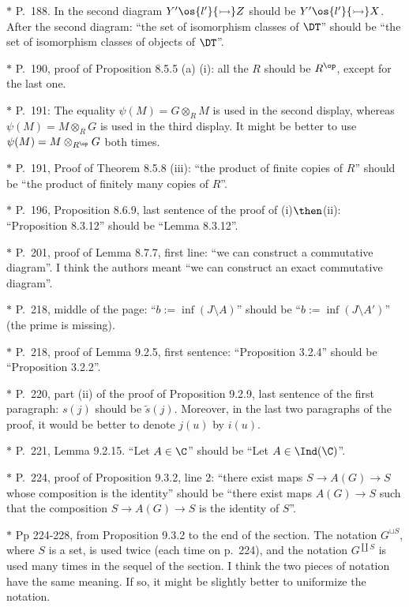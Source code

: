 \documentclass[12pt]{article}
\theoremstyle{remark}
\theoremstyle{definition}
\begin{document}
\nn$*$ P.~188. In the second diagram $Y'\os{l'}{\rightarrowtail}Z$ should be $Y'\os{l'}{\rightarrowtail}X$. After the second diagram: ``the set of isomorphism classes of $\DT$'' should be ``the set of isomorphism classes of objects of $\DT$''.

\nn$*$ P.~190, proof of Proposition 8.5.5 (a) (i): all the $R$ should be $R^{\op}$, except for the last one.

\nn$*$ P.~191: The equality $\psi(M)=G\otimes_RM$ is used in the second display, whereas $\psi(M)=M\otimes_RG$ is used in the third display. It might be better to use $\psi(M)=M\otimes_{R^{\op}}G$ both times. 

\nn$*$ P.~191, Proof of Theorem 8.5.8 (iii): ``the product of finite copies of $R$'' should be ``the product of finitely many copies of $R$''.

\nn$*$ P.~196, Proposition 8.6.9, last sentence of the proof of (i)$\then$(ii): ``Proposition 8.3.12'' should be ``Lemma 8.3.12''.

\nn$*$ P.~201, proof of Lemma 8.7.7, first line: ``we can construct a commutative diagram''. I think the authors meant ``we can construct an exact commutative diagram''.

\nn$*$ P.~218, middle of the page: ``$b:=\inf(J\setminus A)$'' should be ``$b:=\inf(J\setminus A')$'' (the prime is missing). 

\nn$*$ P.~218, proof of Lemma 9.2.5, first sentence: ``Proposition 3.2.4'' should be ``Proposition 3.2.2''. 

\nn$*$ P.~220, part (ii) of the proof of Proposition 9.2.9, last sentence of the first paragraph: $s(j)$ should be $\tilde s(j)$. Moreover, in the last two paragraphs of the proof, it would be better to denote $j(u)$ by $i(u)$. 

\nn$*$ P.~221, Lemma 9.2.15. ``Let $A\in\C$'' should be ``Let $A\in\Ind(\C)$''.

\nn$*$ P.~224, proof of Proposition 9.3.2, line 2: ``there exist maps $S\to A(G)\to S$ whose composition is the identity'' should be ``there exist maps $A(G)\to S$ such that the composition $S\to A(G)\to S$ is the identity of $S$''.

\nn$*$ Pp 224-228, from Proposition 9.3.2 to the end of the section. The notation $G^{\sqcup S}$, where $S$ is a set, is used twice (each time on p.~224), and the notation $G^{\coprod S}$ is used many times in the sequel of the section. I think the two pieces of notation have the same meaning. If so, it might be slightly better to uniformize the notation.
\end{document}
